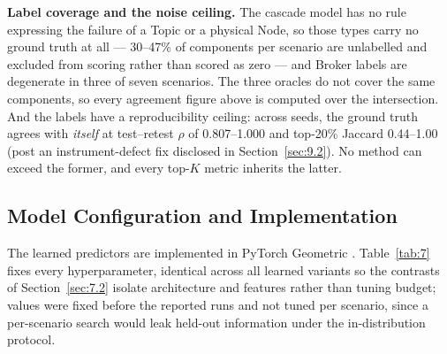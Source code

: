 \textbf{Label coverage and the noise ceiling.} The cascade model has no rule expressing the failure
of a Topic or a physical Node, so those types carry no ground truth at all --- 30--47\% of components
per scenario are unlabelled and excluded from scoring rather than scored as zero --- and Broker
labels are degenerate in three of seven scenarios. The three oracles do not cover the same
components, so every agreement figure above is computed over the intersection. And the labels have a
reproducibility ceiling: across seeds, the ground truth agrees with \emph{itself} at test--retest
\(\rho\) of 0.807--1.000 and top-20\% Jaccard 0.44--1.00 (post an instrument-defect fix disclosed in
Section~\ref{sec:9.2}). No method can exceed the former, and every top-\(K\) metric inherits the
latter.

\hypertarget{model-configuration-and-implementation}{%
\subsection{Model Configuration and Implementation}\label{model-configuration-and-implementation}}

\label{sec:7.5}

The learned predictors are implemented in PyTorch Geometric \cite{fey2019fast}. Table~\ref{tab:7}
fixes every hyperparameter, identical across all learned variants so the contrasts of
Section~\ref{sec:7.2} isolate architecture and features rather than tuning budget; values were fixed
before the reported runs and not tuned per scenario, since a per-scenario search would leak held-out
information under the in-distribution protocol.

